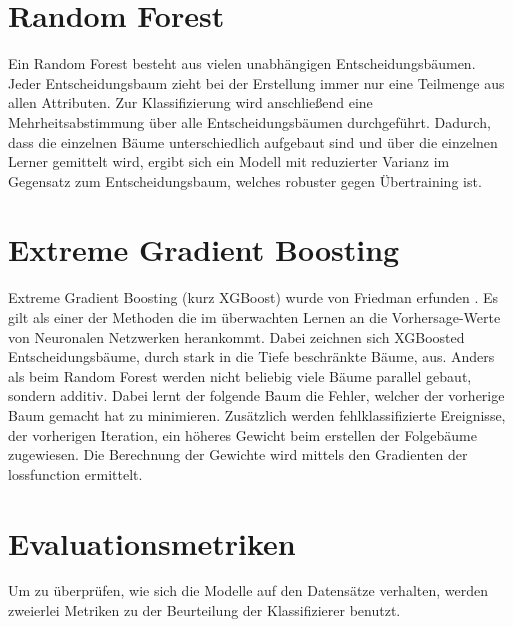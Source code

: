 \section{Random Forest}
Ein Random Forest besteht aus vielen unabhängigen Entscheidungsbäumen.
Jeder Entscheidungsbaum zieht bei der Erstellung immer nur eine Teilmenge aus allen Attributen.
Zur Klassifizierung wird anschließend eine Mehrheitsabstimmung über alle Entscheidungsbäumen durchgeführt.
Dadurch, dass die einzelnen Bäume unterschiedlich aufgebaut sind und über die einzelnen Lerner gemittelt wird, ergibt sich ein Modell mit reduzierter Varianz im Gegensatz zum Entscheidungsbaum, welches robuster gegen Übertraining ist.
\section{Extreme Gradient Boosting}
Extreme Gradient Boosting (kurz XGBoost) wurde von Friedman erfunden \cite{xgboost}.
Es gilt als einer der Methoden die im überwachten Lernen an die Vorhersage-Werte von Neuronalen Netzwerken herankommt.
Dabei zeichnen sich  XGBoosted Entscheidungsbäume, durch stark in die Tiefe beschränkte Bäume, aus.
Anders als beim Random Forest werden nicht beliebig viele Bäume parallel gebaut, sondern additiv. 
Dabei lernt der folgende Baum die Fehler, welcher der vorherige Baum gemacht hat zu minimieren.
Zusätzlich werden fehlklassifizierte Ereignisse, der vorherigen Iteration, ein höheres Gewicht beim erstellen der Folgebäume zugewiesen.
Die Berechnung der Gewichte wird mittels den Gradienten der lossfunction ermittelt.

\section{Evaluationsmetriken}
Um zu überprüfen, wie sich die Modelle auf den Datensätze verhalten, werden zweierlei Metriken zu der Beurteilung der Klassifizierer benutzt.
